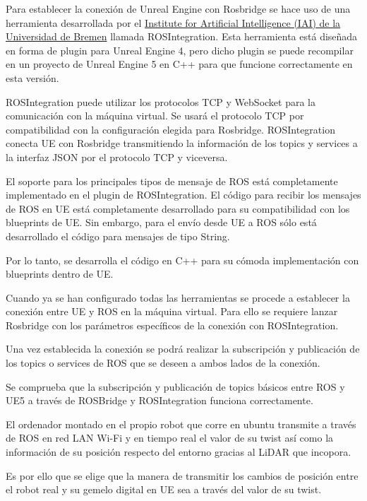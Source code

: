 \documentclass[a4paper, 12pt, spanish, twoside]{article}
\begin{document}
Para establecer la conexión de Unreal Engine con Rosbridge se hace uso de una herramienta desarrollada por el \href{https://ai.uni-bremen.de/}{Institute for Artificial Intelligence (IAI) de la Universidad de Bremen} llamada ROSIntegration. Esta herramienta está diseñada en forma de plugin para Unreal Engine 4, pero dicho plugin se puede recompilar en un proyecto de Unreal Engine 5 en C++ para que funcione correctamente en esta versión. 

ROSIntegration puede utilizar los protocolos TCP y WebSocket para la comunicación con la máquina virtual. Se usará el protocolo TCP por compatibilidad con la configuración elegida para Rosbridge. ROSIntegration conecta UE con Rosbridge transmitiendo la información de los topics y services a la interfaz JSON por el protocolo TCP y viceversa. 

El soporte para los principales tipos de mensaje de ROS está completamente implementado en el plugin de ROSIntegration. El código para recibir los mensajes de ROS en UE está completamente desarrollado para su compatibilidad con los blueprints de UE. Sin embargo, para el envío desde UE a ROS sólo está desarrollado el código para mensajes de tipo String.  

Por lo tanto, se desarrolla el código en C++ para su cómoda implementación con blueprints dentro de UE. 

Cuando ya se han configurado todas las herramientas se procede a establecer la conexión entre UE y ROS en la máquina virtual. Para ello se requiere lanzar Rosbridge con los parámetros específicos de la conexión con ROSIntegration.  

Una vez establecida la conexión se podrá realizar la subscripción y publicación de los topics o services de ROS que se deseen a ambos lados de la conexión. 

Se comprueba que la subscripción y publicación de topics básicos entre ROS y UE5 a través de ROSBridge y ROSIntegration funciona correctamente. 


El ordenador montado en el propio robot que corre en ubuntu transmite a través de ROS en red LAN Wi-Fi y en tiempo real el valor de su twist así como la información de su posición respecto del entorno gracias al LiDAR que incopora. 

Es por ello que se elige que la manera de transmitir los cambios de posición entre el robot real y su gemelo digital en UE sea a través del valor de su twist. 
\end{document}
